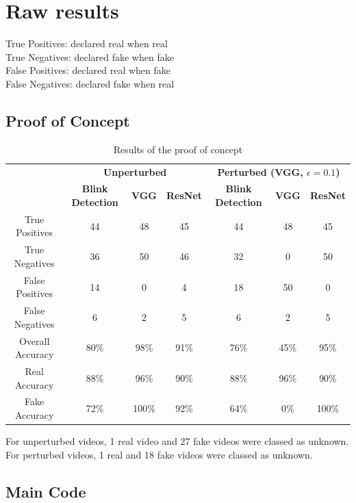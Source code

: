 \chapter{Raw results}
\label{ch:raw-results}

True Positives: declared real when real\\
True Negatives: declared fake when fake\\
False Positives: declared real when fake\\
False Negatives: declared fake when real

\section{Proof of Concept}

\begin{table}[h]
    \centering
    \begin{tabular}{| c | c | c | c | c | c | c |}
        \hline
        \multirow{2}{*}{} & \multicolumn{3}{c|}{\textbf{Unperturbed}} & \multicolumn{3}{c|}{\textbf{Perturbed (VGG, $\epsilon=0.1$)}} \\
        \cline{2-7}
        & \textbf{Blink Detection} & \textbf{VGG} & \textbf{ResNet} & \textbf{Blink Detection} & \textbf{VGG} & \textbf{ResNet} \\
        \hline
        True Positives & 44 & 48 & 45 & 44 & 48 & 45 \\
        \hline
        True Negatives & 36 & 50 & 46 & 32 & 0 & 50 \\
        \hline
        False Positives & 14 & 0 & 4 & 18 & 50 & 0 \\
        \hline
        False Negatives & 6 & 2 & 5 & 6 & 2 & 5 \\
        \hline
        Overall Accuracy & 80\% & 98\% & 91\% & 76\% & 45\% & 95\% \\
        \hline
        Real Accuracy & 88\% & 96\% & 90\% & 88\% & 96\% & 90\% \\
        \hline
        Fake Accuracy & 72\% & 100\% & 92\% & 64\% & 0\% & 100\% \\
        \hline
    \end{tabular}
    \caption{Results of the proof of concept}
    \label{tab:proof-of-concept}
\end{table}

For unperturbed videos, 1 real video and 27 fake videos were classed as unknown. For perturbed videos, 1 real and 18 fake videos were classed as unknown.  

\section{Main Code}

